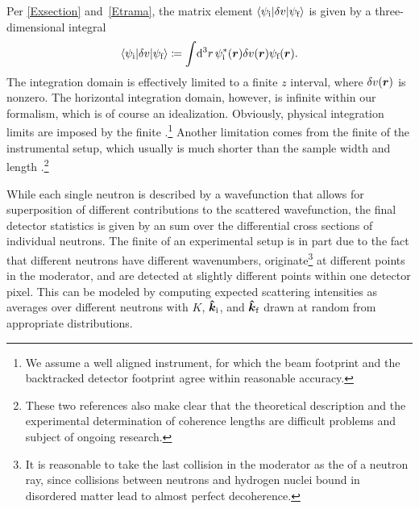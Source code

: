Per \cref{Exsection} and~\cref{Etrama},
%
the matrix element $\braket{\psi_{\text{i}}|\delta v|\psi_{\text{f}}}$
is given by a three-dimensional integral
\begin{equation}\label{Etrama3}
  \braket{\psi_\si|\delta v|\psi_\sf}
  \coloneqq  \int\!\d^3r\, \psi^{*}_\si(\r)\delta v(\r)\psi_\sf(\r).
\end{equation}
The integration domain is effectively limited to a finite $z$ interval,
where $\delta v(\bm{r})$ is nonzero.
The horizontal integration domain, however, is infinite
within our formalism,
which is of course an idealization.
Obviously, physical integration limits are imposed by the finite
%
.\footnote
{We assume a well aligned instrument,
for which the beam footprint and the backtracked detector footprint
%
%
%
agree within reasonable accuracy.}
Another limitation comes from the finite 
of the instrumental setup,
which usually is much shorter than the sample width and length
\cite{HaPR10,MaMM14}.\footnote
{These two references also make clear that
  the theoretical description and the experimental determination of
  coherence lengths are difficult problems and subject of ongoing research.}

While each single neutron is described by a wavefunction
that allows for  superposition of
different contributions to the scattered wavefunction,
the final detector statistics
%
is given by an  sum
over the differential cross sections of individual neutrons.
The finite 
%
of an experimental setup is in part due to the fact that
different neutrons have different wavenumbers,
originate\footnote
{It is reasonable to take the last collision in the moderator
  as the  of a neutron ray,
  since collisions between neutrons and hydrogen nuclei bound in
  disordered matter lead to almost perfect decoherence.}
at different points in the moderator,
and are detected at slightly different points within one detector pixel.
This can be modeled by computing expected scattering intensities as
averages over different neutrons with
$K$, $\bm{\hat k}_{\text{i}}$, and $\bm{\hat k}_{\text{f}}$ drawn at random
from appropriate distributions.

